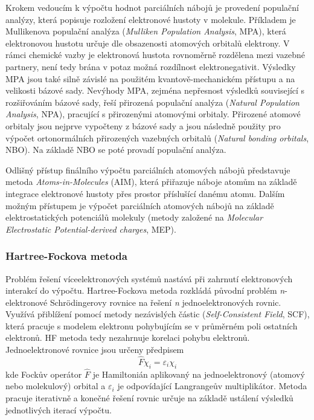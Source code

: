 Krokem vedoucím k výpočtu hodnot parciálních nábojů je provedení populační analýzy, která popisuje rozložení elektronové hustoty v molekule. Příkladem je Mullikenova populační analýza (\textit{Mulliken Population Analysis}, MPA), %
která elektronovou hustotu určuje dle obsazenosti atomových orbitalů  elektrony. V rámci chemické vazby je elektronová hustota rovnoměrně rozdělena mezi vazebné partnery, není tedy brána v potaz možná rozdílnost elektronegativit. Výsledky MPA jsou také silně závislé na použitém kvantově-mechanickém přístupu a na velikosti bázové sady.
Nevýhody MPA, zejména nepřesnost výsledků související s rozšiřováním bázové sady, řeší přirozená populační analýza (\textit{Natural Population Analysis}, NPA), pracující s přirozenými atomovými orbitaly. 
Přirozené atomové orbitaly jsou nejprve vypočteny z bázové sady a jsou následně použity pro výpočet ortonormálních přirozených vazebných orbitalů (\textit{Natural bonding orbitals}, NBO). Na základě NBO se poté provadí populační analýza. %

Odlišný přístup finálního výpočtu parciálních atomových nábojů představuje metoda \textit{Atoms-in-Molecules} (AIM), která přiřazuje náboje atomům na základě integrace elektronové hustoty přes prostor příslušící danému atomu. Dalším možným přístupem je výpočet parciálních atomových nábojů na základě elektrostatických potenciálů molekuly (metody založené na \textit{Molecular Electrostatic Potential-derived charges}, MEP). 


\subsubsection{Hartree-Fockova metoda}
Problém řešení víceelektronových systémů nastává při zahrnutí elektronových interakcí do výpočtu. Hartree-Fockova metoda rozkládá původní problém \textit{n}-elektronové Schrödingerovy rovnice na řešení \textit{n} jednoelektronových rovnic. Využívá přiblížení pomocí metody nezávislých částic (\textit{Self-Consistent Field}, SCF), která pracuje s modelem elektronu pohybujícím se v průměrném poli ostatních elektronů. HF metoda tedy nezahrnuje korelaci pohybu elektronů.
Jednoelektronové rovnice jsou určeny předpisem
\begin{equation}
    \hat{F} \chi_i = \varepsilon_i \chi_i
\end{equation}
kde Fockův operátor $\hat{F}$ je Hamiltonián aplikovaný na jednoelektronový (atomový nebo molekulový) orbital a $\varepsilon_i$ je odpovídající Langrangeův multiplikátor. Metoda pracuje iterativně a konečné řešení rovnic určuje na základě ustálení výsledků jednotlivých iterací výpočtu.


